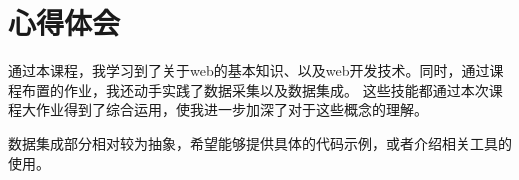 \section{心得体会}

通过本课程，我学习到了关于web的基本知识、以及web开发技术。同时，通过课程布置的作业，我还动手实践了数据采集以及数据集成。
这些技能都通过本次课程大作业得到了综合运用，使我进一步加深了对于这些概念的理解。

数据集成部分相对较为抽象，希望能够提供具体的代码示例，或者介绍相关工具的使用。